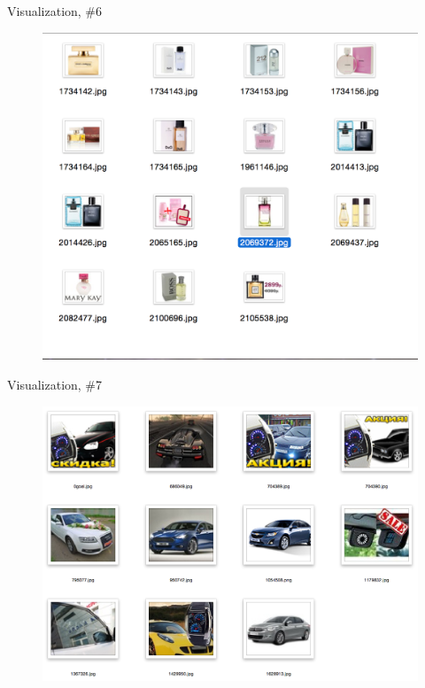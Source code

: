 \documentclass{beamer}
\begin{document}
\begin{frame}{Visualization, \#6}

\begin{figure}[h!]
  \centering
  \includegraphics[width=1\textwidth]{images/search6.png}
\end{figure}

\end{frame}


\begin{frame}{Visualization, \#7}

\begin{figure}[h!]
  \centering
  \includegraphics[width=1\textwidth]{images/search7.png}
\end{figure}

\end{frame}

\end{document}
